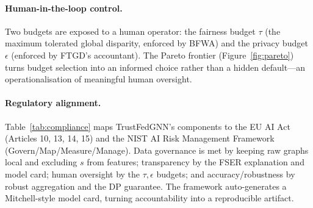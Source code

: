 \paragraph{Human-in-the-loop control.}
Two budgets are exposed to a human operator: the fairness budget $\tau$ (the
maximum tolerated global disparity, enforced by BFWA) and the privacy budget
$\epsilon$ (enforced by FTGD's accountant). The Pareto frontier
(Figure~\ref{fig:pareto}) turns budget selection into an informed choice rather
than a hidden default---an operationalisation of meaningful human oversight.

\paragraph{Regulatory alignment.}
Table~\ref{tab:compliance} maps TrustFedGNN's components to the EU AI Act
(Articles 10, 13, 14, 15) and the NIST AI Risk Management Framework
(Govern/Map/Measure/Manage). Data governance is met by keeping raw graphs local
and excluding $s$ from features; transparency by the FSER explanation and model
card; human oversight by the $\tau,\epsilon$ budgets; and accuracy/robustness by
robust aggregation and the DP guarantee. The framework auto-generates a
Mitchell-style model card, turning accountability into a reproducible artifact.

\begin{table}[t]\centering\small
\caption{Mapping of TrustFedGNN components to EU AI Act articles and NIST AI RMF
functions.}
\label{tab:compliance}

\end{table}
